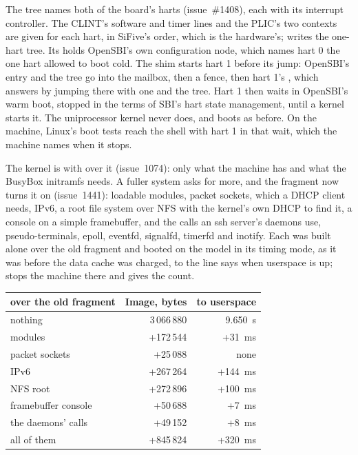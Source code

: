 \documentclass[journal,onecolumn,9pt]{IEEEtran}
\begin{document}
The tree names both of the board's harts (issue~\#1408), each with its
interrupt controller. The CLINT's software and timer lines and the
PLIC's two contexts are given for each hart, in SiFive's order, which
is the hardware's;  writes the one-hart tree. Its
 holds OpenSBI's own configuration node, which names
hart 0 the one hart allowed to boot cold. The shim starts hart 1
before its jump: OpenSBI's entry and the tree go into the mailbox,
then a fence, then hart 1's , which  answers by
jumping there with  one and  the tree. Hart 1 then
waits in OpenSBI's warm boot, stopped in the terms of SBI's hart state
management, until a kernel starts it. The uniprocessor kernel never
does, and boots as before. On the machine, Linux's boot tests reach
the shell with hart 1 in that wait, which the machine names when it
stops.

The kernel is  with  over
it (issue~1074): only what the machine has and what the BusyBox
initramfs needs. A fuller system asks for more, and the fragment now
turns it on (issue~1441): loadable modules, packet sockets, which a
DHCP client needs, IPv6, a root file system over NFS with the kernel's
own DHCP to find it, a console on a simple framebuffer, and the calls
an ssh server's daemons use, pseudo-terminals, epoll, eventfd,
signalfd, timerfd and inotify. Each was built alone over the old
fragment and booted on the model in its timing mode, as it was before
the data cache was charged, to the line
 says when userspace is up;  stops the
machine there and gives the count.

\begin{center}\footnotesize
\begin{tabular}{@{}lrr@{}}
\toprule
over the old fragment & Image, bytes & to userspace \\
\midrule
nothing & 3\,066\,880 & 9.650~s \\
modules & +172\,544 & +31~ms \\
packet sockets & +25\,088 & none \\
IPv6 & +267\,264 & +144~ms \\
NFS root & +272\,896 & +100~ms \\
framebuffer console & +50\,688 & +7~ms \\
the daemons' calls & +49\,152 & +8~ms \\
all of them & +845\,824 & +320~ms \\
\bottomrule
\end{tabular}
\end{center}
\end{document}
